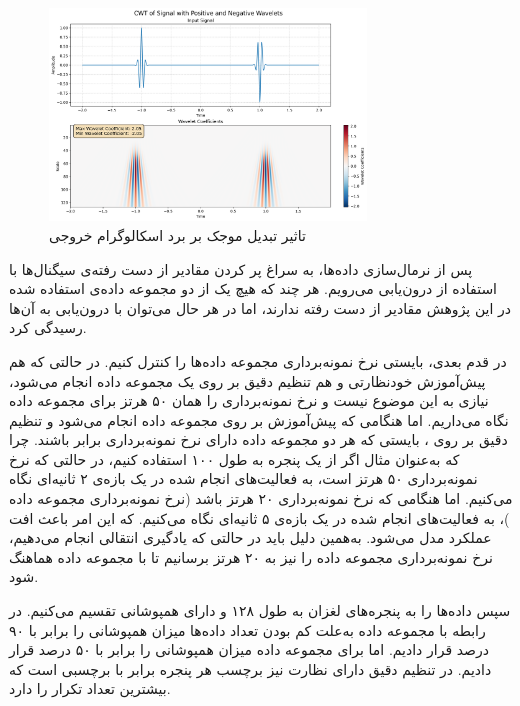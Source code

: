 \begin{figure}[htb!]
\centering
\includegraphics[width=0.75\textwidth]{Images/Chapter4/unnormalized-wavelet.png}
\caption{تاثیر تبدیل موجک بر برد اسکالوگرام خروجی}
\label{fig:unnormalized-wavelet}
\end{figure}

پس از نرمال‌سازی داده‌ها، به سراغ پر کردن مقادیر از دست رفته‌ی سیگنال‌ها با استفاده از درون‌یابی می‌رویم. هر چند که هیچ یک از دو مجموعه داده‌ی استفاده شده در این پژوهش مقادیر از دست رفته ندارند، اما در هر حال می‌توان با درون‌یابی به آن‌ها رسیدگی کرد.

در قدم بعدی، بایستی نرخ نمونه‌برداری مجموعه داده‌ها را کنترل کنیم. در حالتی که هم پیش‌آموزش خودنظارتی و هم تنظیم دقیق بر روی یک مجموعه داده انجام می‌شود، نیازی به این موضوع نیست و نرخ نمونه‌برداری را همان ۵۰ هرتز
برای مجموعه داده 
نگاه می‌داریم. اما هنگامی که پیش‌آموزش بر روی مجموعه داده 
انجام می‌شود و تنظیم دقیق بر روی ،
بایستی که هر دو مجموعه داده دارای نرخ نمونه‌برداری برابر باشند. چرا که به‌عنوان مثال اگر از یک پنجره به طول ۱۰۰ استفاده کنیم، در حالتی که نرخ نمونه‌برداری ۵۰ هرتز است، به فعالیت‌های انجام شده در یک بازه‌ی ۲ ثانیه‌ای نگاه می‌کنیم. اما هنگامی که نرخ نمونه‌برداری ۲۰ هرتز باشد (نرخ نمونه‌برداری مجموعه داده )،
به فعالیت‌های انجام شده در یک بازه‌ی ۵ ثانیه‌ای نگاه می‌کنیم. که این امر باعث افت عملکرد مدل می‌شود. به‌همین دلیل باید در حالتی که یادگیری انتقالی انجام می‌دهیم، نرخ نمونه‌برداری مجموعه داده  را نیز به ۲۰ هرتز برسانیم تا با مجموعه داده 
هماهنگ شود.

سپس داده‌ها را به پنجره‌های لغزان به طول ۱۲۸ و دارای همپوشانی تقسیم می‌کنیم. در رابطه با مجموعه داده  به‌علت کم بودن تعداد داده‌ها میزان همپوشانی را برابر با ۹۰ درصد قرار دادیم. اما برای مجموعه داده  میزان همپوشانی را برابر با ۵۰ درصد قرار دادیم. در تنظیم دقیق دارای نظارت نیز برچسب هر پنجره برابر با برچسبی است که بیشترین تعداد تکرار را دارد.

